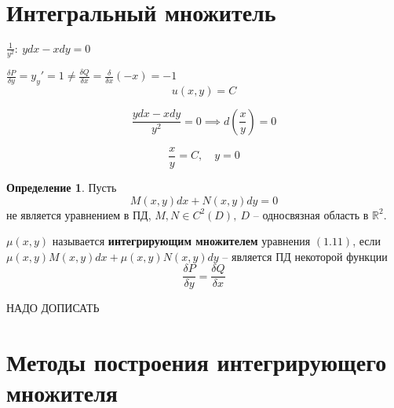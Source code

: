 \documentclass{report}
\theoremstyle{definition}
\newtheorem{definition}{Определение}[section]
\begin{document}
\section{Интегральный множитель}

$\frac{1}{y^2}: \ ydx - xdy = 0$

$\frac{\delta P}{\delta y} = y_y' = 1 \ne \frac{\delta Q}{\delta x} = \frac{\delta}{\delta x}(-x) = -1$
\begin{equation*}
    u(x,y) = C
\end{equation*}

\begin{equation*}
    \frac{ydx - xdy}{y^2} = 0 \implies d(\frac{x}{y}) = 0
\end{equation*}

\begin{equation*}
    \frac{x}{y} = C, \quad y = 0
\end{equation*}

\begin{definition}
    Пусть
    \begin{equation}
        M(x,y)dx + N(x,y)dy = 0
    \end{equation}
    не является уравнением в ПД, $M,N \in C^2(D), \ D$ -- односвязная область в $\mathbb{R}^2$.

    $\mu(x,y)$ называется \textbf{интегрирующим множителем} уравнения $(1.11)$, если $\mu(x,y)M(x,y)dx + \mu (x,y)N(x,y)dy$ -- является ПД некоторой функции
    \begin{equation*}
        \frac{\delta P}{\delta y} = \frac{\delta Q}{\delta x}
    \end{equation*}
    \begin{center}
        {\Large НАДО ДОПИСАТЬ}
    \end{center}
\end{definition}

\section{Методы построения интегрирующего множителя}
\end{document}
